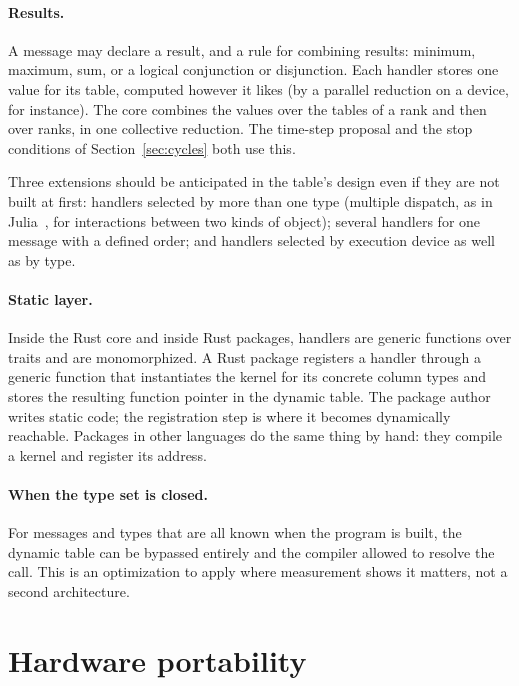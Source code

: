 \documentclass[11pt,a4paper]{article}
\begin{document}
\paragraph{Results.}  A message may declare a result, and a rule for
combining results: minimum, maximum, sum, or a logical conjunction or
disjunction.  Each handler stores one value for its table, computed however
it likes (by a parallel reduction on a device, for instance).  The core
combines the values over the tables of a rank and then over ranks, in one
collective reduction.  The time-step proposal and the stop conditions of
Section~\ref{sec:cycles} both use this.

Three extensions should be anticipated in the table's design even if they are
not built at first: handlers selected by more than one type (multiple
dispatch, as in Julia~\cite{julia}, for interactions between two kinds of
object); several handlers for one message with a defined order; and handlers
selected by execution device as well as by type.

\paragraph{Static layer.}  Inside the Rust core and inside Rust packages,
handlers are generic functions over traits and are monomorphized.  A Rust
package registers a handler through a generic function that instantiates the
kernel for its concrete column types and stores the resulting function
pointer in the dynamic table.  The package author writes static code; the
registration step is where it becomes dynamically reachable.  Packages in
other languages do the same thing by hand: they compile a kernel and register
its address.

\paragraph{When the type set is closed.}  For messages and types that are all
known when the program is built, the dynamic table can be bypassed entirely
and the compiler allowed to resolve the call.  This is an optimization to
apply where measurement shows it matters, not a second architecture.

\section{Hardware portability}
\label{sec:gpu}
\end{document}
